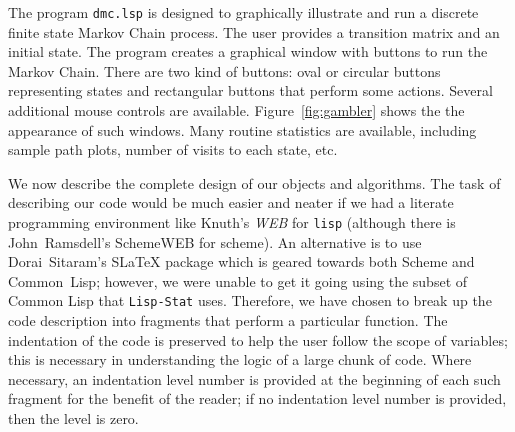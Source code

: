 The program {\tt dmc.lsp} is designed to graphically illustrate and
run a discrete finite state Markov Chain process. The user provides a
transition matrix and an initial state. The program creates a
graphical window with buttons to run the Markov Chain.  There are two
kind of buttons: oval or circular buttons representing states and
rectangular buttons that perform some actions. Several additional
mouse controls are available.  Figure~\ref{fig:gambler} shows the
the appearance of such windows. Many routine
statistics are available, including sample path plots, number of
visits to each state, etc. 

We now describe the complete design of our objects and
algorithms. The task of describing our code would be much easier and
neater if we had a literate programming environment like Knuth's {\em
WEB\/}\cite{wayne} for {\tt lisp} (although there is John~Ramsdell's
SchemeWEB for scheme\cite{lispfaq}).  An alternative is to use Dorai~Sitaram's
S\LaTeX{}\cite{dorai} package which is geared towards both Scheme
and Common~Lisp; however, we were unable to get it going using the
subset of Common 
Lisp that {\tt Lisp-Stat} uses.  Therefore, we have  
chosen to break up the code description into fragments that perform a
particular function.  The indentation of the code is preserved to help
the user follow the scope of variables; this is necessary in
understanding the logic of a large chunk of code. Where necessary, an
indentation level number is provided at the beginning of each such
fragment for the benefit of the reader; if no indentation level number
is provided, then the level is zero.  










